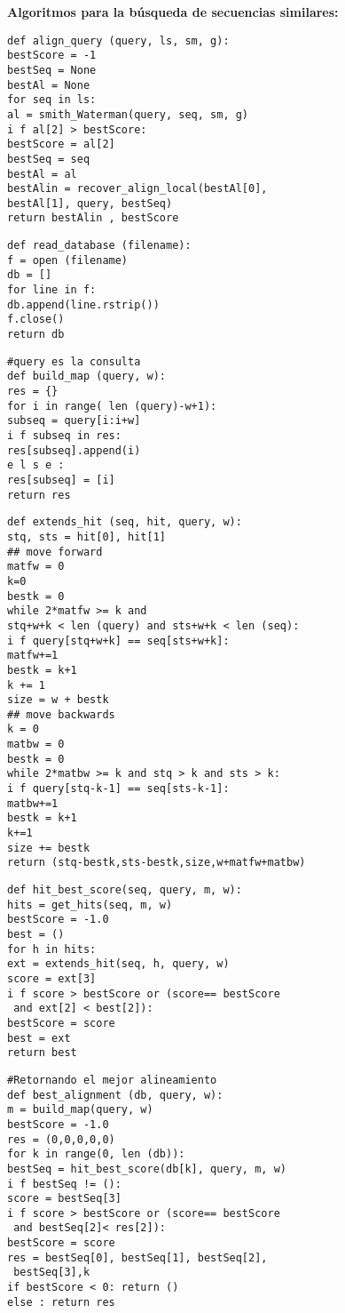 \documentclass[twocolumn,twoside,11pt]{article}
\begin{document}
\textbf{Algoritmos para la b\'usqueda de secuencias similares:}\\
\scriptsize
\begin{lstlisting}[frame=single]
def align_query (query, ls, sm, g):
bestScore = -1
bestSeq = None
bestAl = None
for seq in ls:
al = smith_Waterman(query, seq, sm, g)
i f al[2] > bestScore:
bestScore = al[2]
bestSeq = seq
bestAl = al
bestAlin = recover_align_local(bestAl[0], 
bestAl[1], query, bestSeq)
return bestAlin , bestScore
\end{lstlisting}	
\begin{lstlisting}[frame=single]
def read_database (filename):
f = open (filename)
db = []
for line in f:
db.append(line.rstrip())
f.close()
return db
\end{lstlisting}
\begin{lstlisting}[frame=single]
#query es la consulta
def build_map (query, w):
res = {}
for i in range( len (query)-w+1):
subseq = query[i:i+w]
i f subseq in res:
res[subseq].append(i)
e l s e :
res[subseq] = [i]
return res
\end{lstlisting}


\begin{lstlisting}[frame=single]
def extends_hit (seq, hit, query, w):
stq, sts = hit[0], hit[1]
## move forward
matfw = 0
k=0
bestk = 0
while 2*matfw >= k and 
stq+w+k < len (query) and sts+w+k < len (seq):
i f query[stq+w+k] == seq[sts+w+k]:
matfw+=1
bestk = k+1
k += 1
size = w + bestk
## move backwards
k = 0
matbw = 0
bestk = 0
while 2*matbw >= k and stq > k and sts > k:
i f query[stq-k-1] == seq[sts-k-1]:
matbw+=1
bestk = k+1
k+=1
size += bestk
return (stq-bestk,sts-bestk,size,w+matfw+matbw)
\end{lstlisting}

\begin{lstlisting}[frame=single]
def hit_best_score(seq, query, m, w):
hits = get_hits(seq, m, w)
bestScore = -1.0
best = ()
for h in hits:
ext = extends_hit(seq, h, query, w)
score = ext[3]
i f score > bestScore or (score== bestScore
 and ext[2] < best[2]):
bestScore = score
best = ext
return best
\end{lstlisting}

\begin{lstlisting}[frame=single]
#Retornando el mejor alineamiento
def best_alignment (db, query, w):
m = build_map(query, w)
bestScore = -1.0
res = (0,0,0,0,0)
for k in range(0, len (db)):
bestSeq = hit_best_score(db[k], query, m, w)
i f bestSeq != ():
score = bestSeq[3]
i f score > bestScore or (score== bestScore
 and bestSeq[2]< res[2]):
bestScore = score
res = bestSeq[0], bestSeq[1], bestSeq[2],
 bestSeq[3],k
if bestScore < 0: return ()
else : return res
\end{lstlisting}
\end{document}
